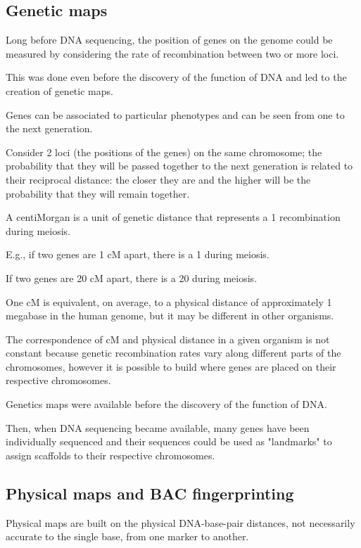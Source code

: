 \subsection{Genetic maps}

Long before DNA sequencing, the position of genes on the genome could be
measured by considering the rate of recombination between two or more loci.

This was done even before the discovery of the function of DNA and led to the
creation of genetic maps.

Genes can be associated to particular phenotypes and can be seen from one to
the next generation.

Consider 2 loci (the positions of the genes) on the same chromosome; the
probability that they will be passed together to the next generation is
related to their reciprocal distance: the closer they are and the higher will
be the probability that they will remain together.

A centiMorgan is a unit of genetic distance that represents a 1%
recombination during meiosis.

E.g., if two genes are 1 cM apart, there is a 1%
during meiosis.

If two genes are 20 cM apart, there is a 20%
during meiosis.

One cM is equivalent, on average, to a physical distance of approximately 1
megabase in the human genome, but it may be different in other organisms.

The correspondence of cM and physical distance in a given organism is not
constant because genetic recombination rates vary along different parts of the
chromosomes, however it is possible to build where genes are placed on their
respective chromosomes.

Genetics maps were available before the discovery of the function of DNA.

Then, when DNA sequencing became available, many genes have been individually
sequenced and their sequences could be used as "landmarks" to assign scaffolds
to their respective chromosomes.

\subsection{Physical maps and BAC fingerprinting}
Physical maps are built on the physical DNA-base-pair distances, not
necessarily accurate to the single base, from one marker to another.

